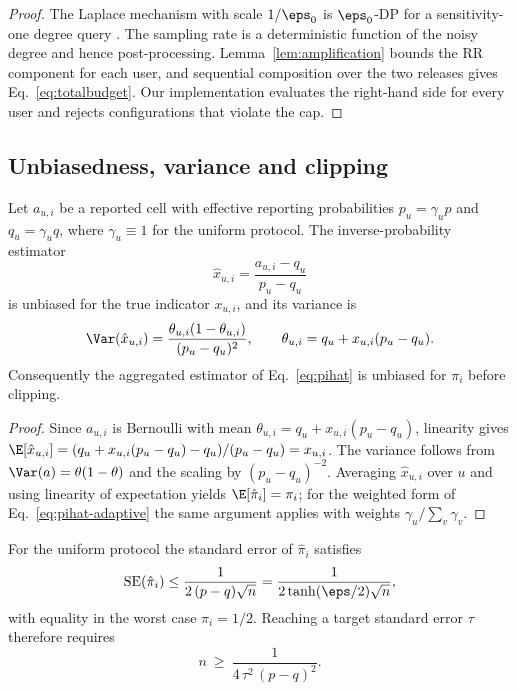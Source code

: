 \begin{proof}
The Laplace mechanism with scale $1/\eps_0$ is $\eps_0$-DP for a sensitivity-one degree query \cite{dwork2006calibrating}. The sampling rate is a deterministic function of the noisy degree and hence post-processing. Lemma~\ref{lem:amplification} bounds the RR component for each user, and sequential composition over the two releases gives Eq.~\eqref{eq:totalbudget}. Our implementation evaluates the right-hand side for every user and rejects configurations that violate the cap.
\end{proof}

\subsection{Unbiasedness, variance and clipping}\label{sec:utility-theory}

\begin{theorem}\label{thm:unbiased}
Let $a_{u,i}$ be a reported cell with effective reporting probabilities $p_u=\gamma_u p$ and $q_u=\gamma_u q$, where $\gamma_u\equiv1$ for the uniform protocol. The inverse-probability estimator
\begin{equation}\label{eq:xhat}
\hat x_{u,i}=\frac{a_{u,i}-q_u}{p_u-q_u}
\end{equation}
is unbiased for the true indicator $x_{u,i}$, and its variance is
\begin{equation}\label{eq:varx}
\Var(\hat x_{u,i})=\frac{\theta_{u,i}(1-\theta_{u,i})}{(p_u-q_u)^{2}},
\qquad \theta_{u,i}=q_u+x_{u,i}(p_u-q_u).
\end{equation}
Consequently the aggregated estimator of Eq.~\eqref{eq:pihat} is unbiased for $\pi_i$ before clipping.
\end{theorem}

\begin{proof}
Since $a_{u,i}$ is Bernoulli with mean $\theta_{u,i}=q_u+x_{u,i}(p_u-q_u)$, linearity gives $\E[\hat x_{u,i}]=(q_u+x_{u,i}(p_u-q_u)-q_u)/(p_u-q_u)=x_{u,i}$. The variance follows from $\Var(a)=\theta(1-\theta)$ and the scaling by $(p_u-q_u)^{-2}$. Averaging $\hat x_{u,i}$ over $u$ and using linearity of expectation yields $\E[\hat\pi_i]=\pi_i$; for the weighted form of Eq.~\eqref{eq:pihat-adaptive} the same argument applies with weights $\gamma_u/\sum_v\gamma_v$.
\end{proof}

\begin{corollary}\label{cor:se}
For the uniform protocol the standard error of $\hat\pi_i$ satisfies
\begin{equation}\label{eq:se}
\mathrm{SE}(\hat\pi_i)\le\frac{1}{2\,(p-q)\sqrt{n}}=\frac{1}{2\tanh(\eps/2)\sqrt{n}} ,
\end{equation}
with equality in the worst case $\pi_i=1/2$. Reaching a target standard error $\tau$ therefore requires
\begin{equation}\label{eq:nreq}
n\ \ge\ \frac{1}{4\,\tau^{2}\,(p-q)^{2}} .
\end{equation}
\end{corollary}

